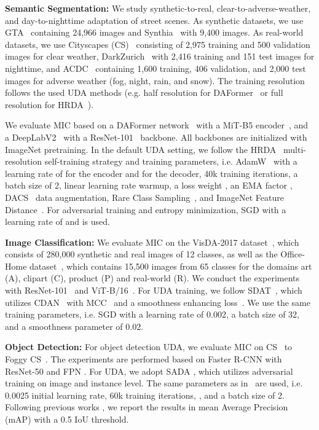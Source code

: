 \documentclass[10pt,twocolumn,letterpaper]{article}
\begin{document}
\noindent\textbf{Semantic Segmentation:}
We study synthetic-to-real, clear-to-adverse-weather, and day-to-nighttime adaptation of street scenes. 
As synthetic datasets, we use GTA~\cite{richter2016playing} containing 24,966 images and Synthia~\cite{ros2016synthia} with 9,400 images. As real-world datasets, we use Cityscapes (CS)~\cite{cordts2016cityscapes} consisting of 2,975 training and 500 validation images for clear weather, DarkZurich~\cite{sakaridis2020map} with 2,416 training
and 151 test images for nighttime, and ACDC~\cite{sarkadis2021acdc} containing 1,600 training, 406 validation, and 2,000 test images for adverse weather (fog, night, rain, and snow). The training resolution follows the used UDA methods (e.g. half resolution for DAFormer~\cite{hoyer2021daformer} or full resolution for HRDA~\cite{hoyer2022hrda}).

We evaluate MIC based on a DAFormer network~\cite{hoyer2021daformer} with a MiT-B5 encoder~\cite{xie2021segformer}, and a DeepLabV2~\cite{chen2017deeplab} with a ResNet-101~\cite{he2016deep} backbone. All backbones are initialized with ImageNet pretraining.
In the default UDA setting, we follow the HRDA~\cite{hoyer2022hrda} multi-resolution self-training strategy and training parameters, i.e. AdamW~\cite{loshchilov2018decoupled} with a learning rate of  for the encoder and  for the decoder, 40k training iterations, a batch size of 2, linear learning rate warmup, a loss weight , an EMA factor , DACS~\cite{tranheden2021dacs} data augmentation, Rare Class Sampling~\cite{hoyer2021daformer}, and ImageNet Feature Distance~\cite{hoyer2021daformer}. 
For adversarial training and entropy minimization, SGD with a learning rate of  and  is used.

\noindent\textbf{Image Classification:}
We evaluate MIC on the VisDA-2017 dataset~\cite{peng2017visda}, which consists of 280,000 synthetic and real images of 12 classes, as well as the Office-Home dataset~\cite{venkateswara2017deep}, which contains 15,500 images from 65 classes for the domains art (A), clipart (C), product (P) and real-world (R).
We conduct the experiments with ResNet-101~\cite{he2016deep} and ViT-B/16~\cite{dosovitskiy2020image}. For UDA training, we follow SDAT~\cite{rangwani2022closer}, which utilizes CDAN~\cite{long2018conditional} with MCC~\cite{jin2020minimum} and a smoothness enhancing loss~\cite{rangwani2022closer}. We use the same training parameters, i.e. SGD with a learning rate of 0.002, a batch size of 32, and a smoothness parameter of 0.02.

\noindent\textbf{Object Detection:}
For object detection UDA, we evaluate MIC on CS~\cite{cordts2016cityscapes} to Foggy CS~\cite{sakaridis2018semantic}.
The experiments are performed based on Faster R-CNN \cite{ren2015faster} with ResNet-50 \cite{he2016deep} and FPN \cite{lin2017feature}. For UDA, we adopt SADA \cite{chen2021scale}, which utilizes adversarial training 
on image and instance level. The same parameters as in~\cite{chen2021scale} are used, i.e. 0.0025 initial learning rate, 60k training iterations, , and a batch size of 2. Following previous works \cite{saito2019strong,chen2021scale}, we report the results in mean Average Precision (mAP) with a 0.5 IoU threshold.
\end{document}
